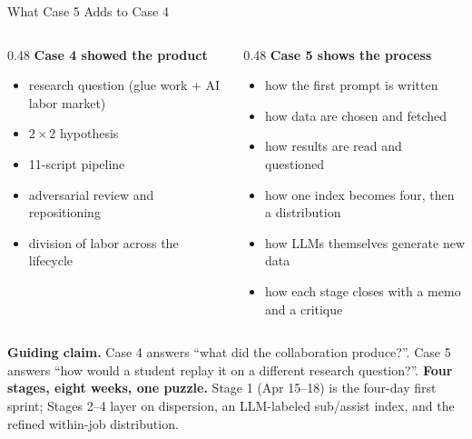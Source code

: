 \documentclass[10pt,english,aspectratio=169]{beamer}
\begin{document}
\begin{frame}{What Case 5 Adds to Case 4}
\begin{columns}[T]
\begin{column}{0.48\textwidth}
\textbf{Case 4 showed the product}
\begin{itemize}\small
  \item research question (glue work + AI labor market)
  \item $2\times 2$ hypothesis
  \item 11-script pipeline
  \item adversarial review and repositioning
  \item division of labor across the lifecycle
\end{itemize}
\end{column}
\begin{column}{0.48\textwidth}
\textbf{Case 5 shows the process}
\begin{itemize}\small
  \item how the first prompt is written
  \item how data are chosen and fetched
  \item how results are read and questioned
  \item how one index becomes four, then a distribution
  \item how LLMs themselves generate new data
  \item how each stage closes with a memo and a critique
\end{itemize}
\end{column}
\end{columns}

\vspace{0.25cm}
\begin{tcolorbox}[colback=blue!3,colframe=RedTitle!60]
\textbf{Guiding claim.} Case 4 answers ``what did the collaboration produce?''. Case 5 answers ``how would a student replay it on a different research question?''. \textbf{Four stages, eight weeks, one puzzle.} Stage 1 (Apr 15--18) is the four-day first sprint; Stages 2--4 layer on dispersion, an LLM-labeled sub/assist index, and the refined within-job distribution.
\end{tcolorbox}
\end{frame}
\end{document}
